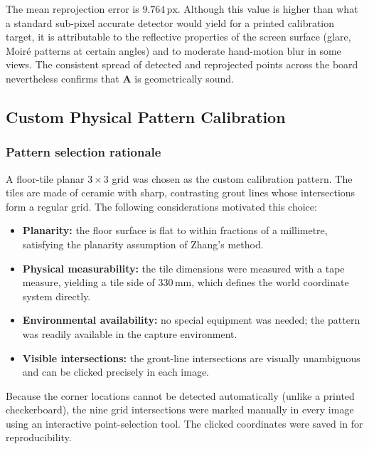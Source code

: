 \documentclass[11pt,a4paper]{article}
\begin{document}
The mean reprojection error is $9.764\,\mathrm{px}$.  Although this value
is higher than what a standard sub-pixel accurate detector would yield for
a printed calibration target, it is attributable to the reflective
properties of the screen surface (glare, Moir\'{e} patterns at certain
angles) and to moderate hand-motion blur in some views.  The consistent
spread of detected and reprojected points across the board nevertheless
confirms that $\mathbf{A}$ is geometrically sound.

\subsection{Custom Physical Pattern Calibration}
\label{sec:custom_calib}

\subsubsection*{Pattern selection rationale}

A floor-tile planar $3 \times 3$ grid was chosen as the custom calibration
pattern.  The tiles are made of ceramic with sharp, contrasting grout lines
whose intersections form a regular grid.  The following considerations
motivated this choice:
\begin{itemize}
    \item \textbf{Planarity:} the floor surface is flat to within fractions
          of a millimetre, satisfying the planarity assumption of Zhang's method.
    \item \textbf{Physical measurability:} the tile dimensions were measured
          with a tape measure, yielding a tile side of $330\,\mathrm{mm}$,
          which defines the world coordinate system directly.
    \item \textbf{Environmental availability:} no special equipment was needed;
          the pattern was readily available in the capture environment.
    \item \textbf{Visible intersections:} the grout-line intersections are
          visually unambiguous and can be clicked precisely in each image.
\end{itemize}

Because the corner locations cannot be detected automatically (unlike a
printed checkerboard), the nine grid intersections were marked manually
in every image using an interactive point-selection tool.  The clicked
coordinates were saved in 
for reproducibility.
\end{document}
